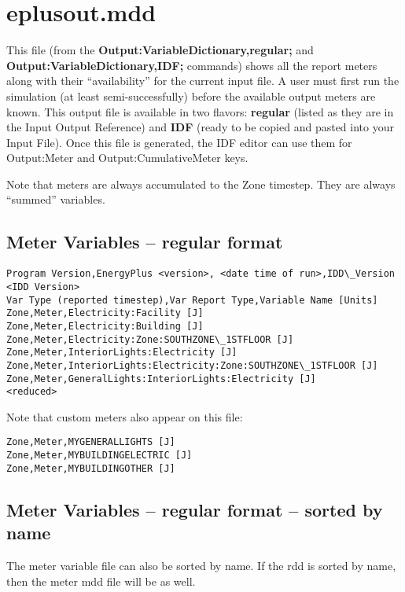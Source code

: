 \section{eplusout.mdd}

This file (from the \textbf{Output:VariableDictionary,regular;} and \textbf{Output:VariableDictionary,IDF;} commands) shows all the report meters along with their “availability” for the current input file. A user must first run the simulation (at least semi-successfully) before the available output meters are known. This output file is available in two flavors: \textbf{regular} (listed as they are in the Input Output Reference) and \textbf{IDF} (ready to be copied and pasted into your Input File). Once this file is generated, the IDF editor can use them for Output:Meter and Output:CumulativeMeter keys.

Note that meters are always accumulated to the Zone timestep. They are always “summed” variables.

\subsection{Meter Variables – regular format}

\begin{lstlisting}
Program Version,EnergyPlus <version>, <date time of run>,IDD\_Version <IDD Version>
Var Type (reported timestep),Var Report Type,Variable Name [Units]
Zone,Meter,Electricity:Facility [J]
Zone,Meter,Electricity:Building [J]
Zone,Meter,Electricity:Zone:SOUTHZONE\_1STFLOOR [J]
Zone,Meter,InteriorLights:Electricity [J]
Zone,Meter,InteriorLights:Electricity:Zone:SOUTHZONE\_1STFLOOR [J]
Zone,Meter,GeneralLights:InteriorLights:Electricity [J]
<reduced>
\end{lstlisting}

Note that custom meters also appear on this file:

\begin{lstlisting}
Zone,Meter,MYGENERALLIGHTS [J]
Zone,Meter,MYBUILDINGELECTRIC [J]
Zone,Meter,MYBUILDINGOTHER [J]
\end{lstlisting}

\subsection{Meter Variables – regular format – sorted by name}

The meter variable file can also be sorted by name. If the rdd is sorted by name, then the meter mdd file will be as well.

